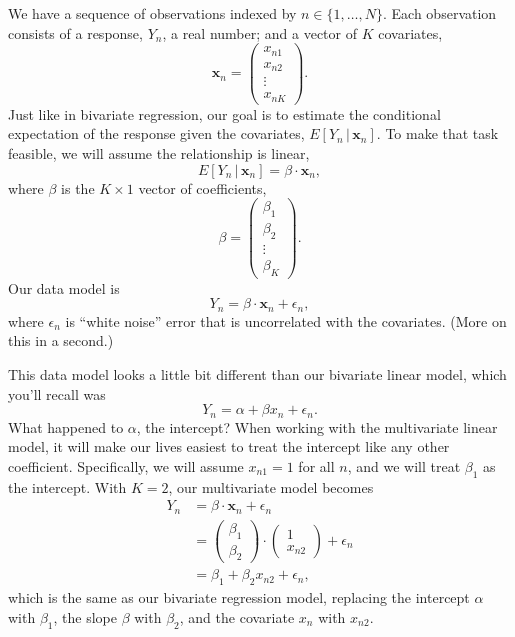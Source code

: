 \documentclass[12pt,oneside,openany]{book}
\begin{document}
We have a sequence of observations indexed by
\(n \in \{1, \ldots, N\}\). Each observation consists of a response,
\(Y_n\), a real number; and a vector of \(K\) covariates, \[
\mathbf{x}_n = \begin{pmatrix}
  x_{n1} \\
  x_{n2} \\
  \vdots \\
  x_{nK}
\end{pmatrix}.
\] Just like in bivariate regression, our goal is to estimate the
conditional expectation of the response given the covariates,
\(E[Y_n \,|\, \mathbf{x}_n]\). To make that task feasible, we will
assume the relationship is linear, \[
E[Y_n \,|\, \mathbf{x}_n] = \beta \cdot \mathbf{x}_n,
\] where \(\beta\) is the \(K \times 1\) vector of coefficients, \[
\beta = \begin{pmatrix}
  \beta_1 \\
  \beta_2 \\
  \vdots \\
  \beta_K
\end{pmatrix}.
\] Our data model is \[
Y_n = \beta \cdot \mathbf{x}_n + \epsilon_n,
\] where \(\epsilon_n\) is ``white noise'' error that is uncorrelated
with the covariates. (More on this in a second.)

This data model looks a little bit different than our bivariate linear
model, which you'll recall was \[
Y_n = \alpha + \beta x_n + \epsilon_n.
\] What happened to \(\alpha\), the intercept? When working with the
multivariate linear model, it will make our lives easiest to treat the
intercept like any other coefficient. Specifically, we will assume
\(x_{n1} = 1\) for all \(n\), and we will treat \(\beta_1\) as the
intercept. With \(K = 2\), our multivariate model becomes \[
\begin{aligned}
Y_n &= \beta \cdot \mathbf{x}_n + \epsilon_n \\
&= \begin{pmatrix} \beta_1 \\ \beta_2 \end{pmatrix} \cdot \begin{pmatrix} 1 \\ x_{n2} \end{pmatrix} + \epsilon_n \\
&= \beta_1 + \beta_2 x_{n2} + \epsilon_n,
\end{aligned}
\] which is the same as our bivariate regression model, replacing the
intercept \(\alpha\) with \(\beta_1\), the slope \(\beta\) with
\(\beta_2\), and the covariate \(x_n\) with \(x_{n2}\).
\end{document}
